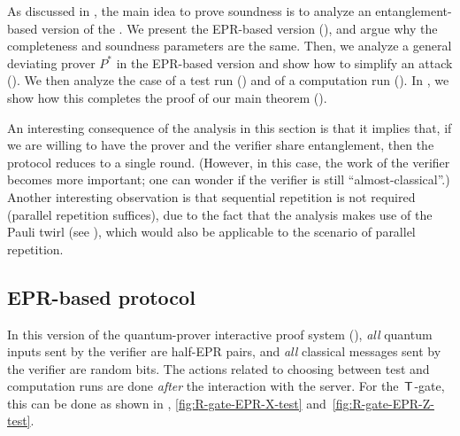 \documentclass{toc}
\newcommand{\rgate}{{\sf T}}
\begin{document}
As discussed in , the main idea to prove soundness is to analyze an entanglement-based version of the . We present the EPR-based version (),  and argue why the completeness and soundness parameters are the same.
%
Then, we analyze a general deviating prover $P^*$ in the EPR-based version and show how to simplify an attack (). We then analyze the case of a test run () and of a computation run (). In , we show how this completes the proof of our main theorem ().

An interesting consequence of the analysis in this section is that it implies that,
if we are willing to have the prover and the verifier share entanglement,
then the protocol reduces to a single round.
%
%
(However, in this case, the work of the verifier becomes
more important; one can wonder if the verifier is still ``almost-classical''.)
%
Another interesting observation is
that sequential repetition is not required (parallel repetition suffices), due to the fact that the analysis  makes use of the Pauli twirl (see ), which would also be applicable to the scenario of parallel repetition.


\subsection{EPR-based protocol}
\label{sec:EPR-based-QPIP}


In this version of the quantum-prover interactive proof system (\textbf{}), \emph{all} quantum inputs sent by the verifier are half-EPR pairs, and \emph{all} classical messages sent by the verifier are random bits. The actions related to choosing between test and computation runs are done \emph{after} the interaction with the server.  For the~$\rgate$-gate, this can be done as shown in , \ref{fig:R-gate-EPR-X-test} and~\ref{fig:R-gate-EPR-Z-test}.
\end{document}
